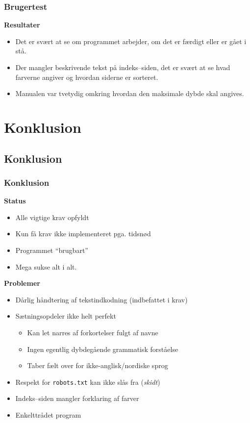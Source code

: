 \documentclass{beamer}
\begin{document}
\begin{frame}
  \frametitle{Brugertest}
  \textbf{Resultater}
  \begin{itemize}
  \item Det er svært at se om programmet arbejder, om det er færdigt
    eller er gået i stå.
  \item Der mangler beskrivende tekst på indeks--siden, det er svært
    at se hvad farverne angiver og hvordan siderne er sorteret.
  \item Manualen var tvetydig omkring hvordan den maksimale dybde skal
    angives.
  \end{itemize}

\end{frame}

\section{Konklusion}
\subsection{Konklusion}
\begin{frame}
  \frametitle{Konklusion}

  \textbf{Status}

  \begin{itemize}
  \item<1-> Alle vigtige krav opfyldt
  \item<2-> Kun få krav ikke implementeret pga. tidsnød
  \item<3-> Programmet ``brugbart''
  \item<4-> Mega sukse alt i alt.
  \end{itemize}

\pause
\pause
\pause
\pause
  \textbf{Problemer}

  \begin{itemize}
  \item<5-> Dårlig håndtering af tekstindkodning (indbefattet i krav)
  \item<6-> Sætningsopdeler ikke helt perfekt
    \begin{itemize}
    \item<6-> Kan let narres af forkortelser fulgt af navne
    \item<6-> Ingen egentlig dybdegående grammatisk forståelse
    \item<6-> Taber fælt over for ikke-anglisk/nordiske sprog
    \end{itemize}
  \item<7-> Respekt for \texttt{robots.txt} kan ikke slås fra (\textit{skidt})
  \item<8-> Indeks--siden mangler forklaring af farver
  \item<9-> Enkelttrådet program
  \end{itemize}
\end{frame}
\end{document}
